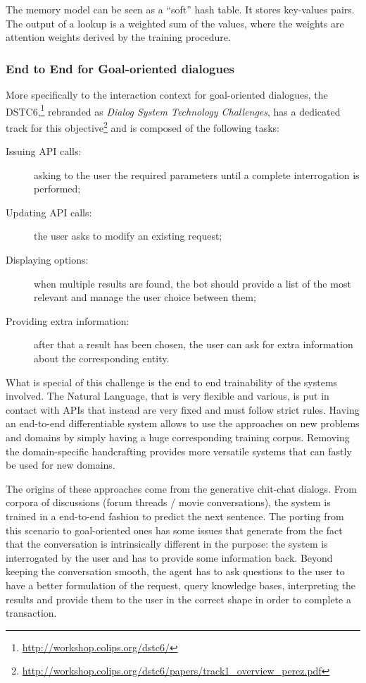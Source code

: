 The memory model can be seen as a ``soft'' hash table. It stores key-values pairs. The output of a lookup is a weighted sum of the values, where the weights are attention weights derived by the training procedure.

\subsubsection{End to End for Goal-oriented dialogues}
More specifically to the interaction context for goal-oriented dialogues, the DSTC6,\footnote{\url{http://workshop.colips.org/dstc6/}} rebranded as \textit{Dialog System Technology Challenges}, has a dedicated track for this objective\footnote{\url{http://workshop.colips.org/dstc6/papers/track1_overview_perez.pdf}} and is composed of the following tasks:

\begin{description}
	\item[Issuing API calls:] asking to the user the required parameters until a complete interrogation is performed;
	\item[Updating API calls:] the user asks to modify an existing request;
	\item[Displaying options:] when multiple results are found, the bot should provide a list of the most relevant and manage the user choice between them;
	\item[Providing extra information:] after that a result has been chosen, the user can ask for extra information about the corresponding entity.
\end{description}
What is special of this challenge is the end to end trainability of the systems involved. The Natural Language, that is very flexible and various, is put in contact with APIs that instead are very fixed and must follow strict rules. Having an end-to-end differentiable system allows to use the approaches on new problems and domains by simply having a huge corresponding training corpus. Removing the domain-specific handcrafting provides more versatile systems that can fastly be used for new domains.

The origins of these approaches come from the generative chit-chat dialogs. From corpora of discussions (forum threads / movie conversations), the system is trained in a end-to-end fashion to predict the next sentence. The porting from this scenario to goal-oriented ones has some issues that generate from the fact that the conversation is intrinsically different in the purpose: the system is interrogated by the user and has to provide some information back. Beyond keeping the conversation smooth, the agent has to ask questions to the user to have a better formulation of the request, query knowledge bases, interpreting the results and provide them to the user in the correct shape in order to complete a transaction.

